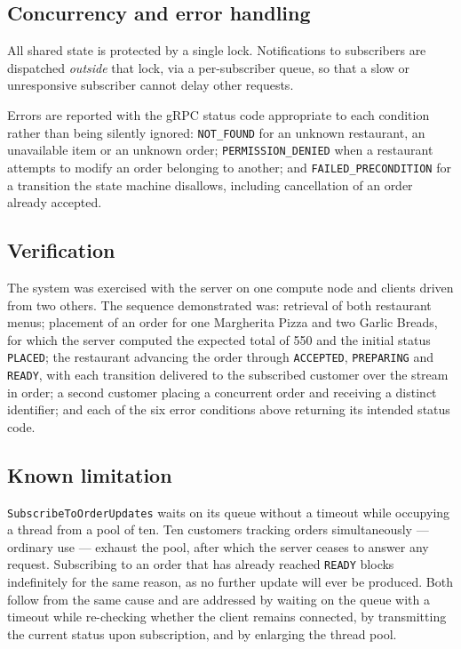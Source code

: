 \documentclass[11pt,a4paper]{article}
\begin{document}
\subsection{Concurrency and error handling}
All shared state is protected by a single lock. Notifications to subscribers are
dispatched \emph{outside} that lock, via a per-subscriber queue, so that a slow or
unresponsive subscriber cannot delay other requests.

Errors are reported with the gRPC status code appropriate to each condition rather than
being silently ignored: \texttt{NOT\_FOUND} for an unknown restaurant, an unavailable
item or an unknown order; \texttt{PERMISSION\_DENIED} when a restaurant attempts to
modify an order belonging to another; and \texttt{FAILED\_PRECONDITION} for a
transition the state machine disallows, including cancellation of an order already
accepted.

\subsection{Verification}
The system was exercised with the server on one compute node and clients driven from two
others. The sequence demonstrated was: retrieval of both restaurant menus; placement of
an order for one Margherita Pizza and two Garlic Breads, for which the server computed
the expected total of 550 and the initial status \texttt{PLACED}; the restaurant
advancing the order through \texttt{ACCEPTED}, \texttt{PREPARING} and \texttt{READY},
with each transition delivered to the subscribed customer over the stream in order; a
second customer placing a concurrent order and receiving a distinct identifier; and each
of the six error conditions above returning its intended status code.

\subsection{Known limitation}
\texttt{SubscribeToOrderUpdates} waits on its queue without a timeout while occupying a
thread from a pool of ten. Ten customers tracking orders simultaneously --- ordinary use
--- exhaust the pool, after which the server ceases to answer any request. Subscribing to
an order that has already reached \texttt{READY} blocks indefinitely for the same reason,
as no further update will ever be produced. Both follow from the same cause and are
addressed by waiting on the queue with a timeout while re-checking whether the client
remains connected, by transmitting the current status upon subscription, and by
enlarging the thread pool.
\end{document}

